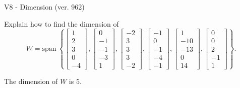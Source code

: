 \begin{exercise}
  \begin{exerciseTitle}V8 - Dimension (ver. 962)\end{exerciseTitle}
  \begin{exerciseStatement}
    Explain how to find the dimension of 
\[W=\mathrm{span}\ \left\{\left[\begin{array}{r}
1 \\
2 \\
3 \\
0 \\
-4
\end{array}\right] , \left[\begin{array}{r}
0 \\
-1 \\
-1 \\
-3 \\
1
\end{array}\right] , \left[\begin{array}{r}
-2 \\
3 \\
3 \\
3 \\
-2
\end{array}\right] , \left[\begin{array}{r}
-1 \\
0 \\
-1 \\
-4 \\
-1
\end{array}\right] , \left[\begin{array}{r}
1 \\
-10 \\
-13 \\
0 \\
14
\end{array}\right] , \left[\begin{array}{r}
0 \\
0 \\
2 \\
-1 \\
1
\end{array}\right]\right\}.\]



  \end{exerciseStatement}
  \begin{exerciseAnswer}
   The dimension of \(W\) is  \(5\).
  


  \end{exerciseAnswer}
\end{exercise}